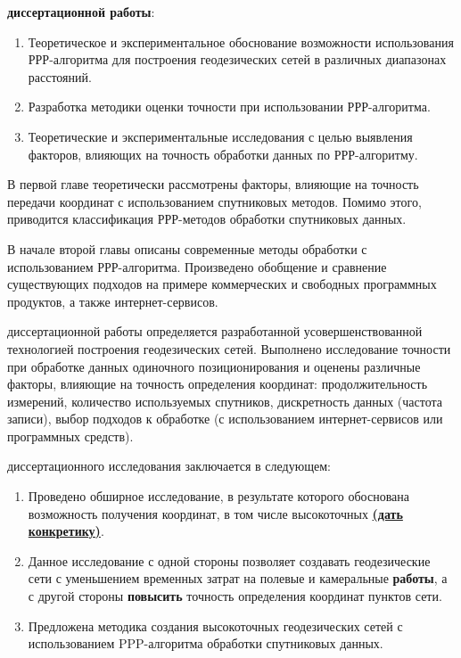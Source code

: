 {\tasks} \textbf{диссертационной работы}:
\begin{enumerate}[beginpenalty=10000] %
	\item Теоретическое и экспериментальное обоснование возможности использования РРР-алгоритма для построения геодезических сетей в различных диапазонах расстояний.
	\item Разработка методики оценки точности при использовании РРР-алгоритма.
	\item Теоретические и экспериментальные исследования с целью выявления факторов, влияющих на точность обработки данных по РРР-алгоритму.
\end{enumerate}

{\theoretical}

В первой главе теоретически рассмотрены факторы, влияющие на точность передачи координат с использованием спутниковых методов. Помимо этого, приводится классификация РРР-методов обработки спутниковых данных.

В начале второй главы описаны современные методы обработки с использованием РРР-алгоритма. Произведено обобщение и сравнение существующих подходов на примере коммерческих и свободных программных продуктов, а также интернет-сервисов.

{\influence} диссертационной работы определяется разработанной усовершенствованной технологией построения геодезических сетей. Выполнено исследование точности при обработке данных одиночного позиционирования и оценены различные факторы, влияющие на точность определения координат: продолжительность измерений, количество используемых спутников, дискретность данных (частота записи), выбор подходов к обработке (с использованием интернет-сервисов или программных средств).

{\novelty} диссертационного исследования заключается в следующем:
\begin{enumerate}[beginpenalty=10000] %
	\item Проведено обширное исследование, в результате которого обоснована возможность получения координат, в том числе высокоточных \underline{\textbf{(дать конкретику)}}.
	\item Данное исследование с одной стороны позволяет создавать геодезические сети с уменьшением временных затрат на полевые и камеральные \textbf{работы}, а с другой стороны \textbf{повысить} точность определения координат пунктов сети.
	\item Предложена методика создания высокоточных геодезических сетей с использованием PPP-алгоритма обработки спутниковых данных.
\end{enumerate}

